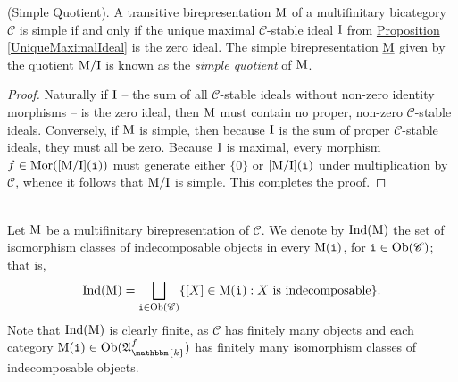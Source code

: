 \noindent\begin{propositiondefinition}\!\textnormal{(Simple Quotient).}\label{SimpleQuotient} \!A transitive birepresentation $\textnormal{M}$ of a %
multifinitary bicategory $\mathscr{C}$ is simple if and only if the unique maximal $\mathscr{C}$-stable ideal $\textnormal{I}$ from \hyperref[UniqueMaximalIdeal]{Proposition \ref*{UniqueMaximalIdeal}} is the zero ideal. The simple birepresentation $\underline{\textnormal{M}}$ given by the quotient $\textnormal{M}/\textnormal{I}$ is known as the {\em simple quotient} of $\textnormal{M}$.\\
\end{propositiondefinition}

\noindent\begin{proof} Naturally if $\textnormal{I}$ -- the sum of all $\mathscr{C}$-stable ideals without non-zero identity morphisms -- is the zero ideal, then $\textnormal{M}$ must contain no proper, non-zero $\mathscr{C}$-stable ideals. Conversely, if $\textnormal{M}$ is simple, then because $\textnormal{I}$ is the sum of proper $\mathscr{C}$-stable ideals, they must all be zero. Because $\textnormal{I}$ is maximal, every morphism $f \in \textnormal{Mor}([\textnormal{M}/\textnormal{I}](\textnormal{\texttt{i}}))$ must generate either $\{0\}$ or $[\textnormal{M}/\textnormal{I}](\textnormal{\texttt{i}})$ under multiplication by $\mathscr{C}$, whence it follows that $\textnormal{M}/\textnormal{I}$ is simple. This completes the proof.
\end{proof}\\

\noindent Let $\textnormal{M}$ be a multifinitary birepresentation of $\mathscr{C}$. We denote by $\textnormal{Ind}(\textnormal{M})$ the set of isomorphism classes of indecomposable objects in every $\textnormal{M}(\textnormal{\texttt{i}})$, for $\textnormal{\texttt{i}} \in \textnormal{Ob}(\mathscr{C})$; that is,
\begin{align*}
\begin{split}
\textnormal{Ind}(\textnormal{M}) = \bigsqcup_{\textnormal{\texttt{i}} \in \textnormal{Ob}(\mathscr{C})} \{[X] \in \textnormal{M}(\textnormal{\texttt{i}}) : \textnormal{$X$ is indecomposable}\}.
\end{split}
\end{align*}
\noindent Note that $\textnormal{Ind}(\textnormal{M})$ is clearly finite, as $\mathscr{C}$ has finitely many objects and each category $\textnormal{M}(\textobj{i}) \in \obset(\mathfrak{A}_\mathbbm{k}^f)$ has finitely many isomorphism classes of indecomposable objects.\\

